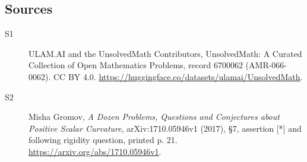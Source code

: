 \documentclass[11pt]{article}
\begin{document}
\subsection{Sources}
\begin{description}
\item[\hypertarget{source:6700062:1}{S1}] ULAM.AI and the UnsolvedMath Contributors, UnsolvedMath: A Curated Collection of Open Mathematics Problems, record 6700062 (AMR-066-0062). CC BY 4.0. \url{https://huggingface.co/datasets/ulamai/UnsolvedMath}.
\item[\hypertarget{source:6700062:2}{S2}] Misha Gromov, \emph{A Dozen Problems, Questions and Conjectures about Positive Scalar Curvature}, arXiv:1710.05946v1 (2017), \S7, assertion [*] and following rigidity question, printed p. 21. \url{https://arxiv.org/abs/1710.05946v1}.
\end{description}
\label{end:6700062}
\end{document}
